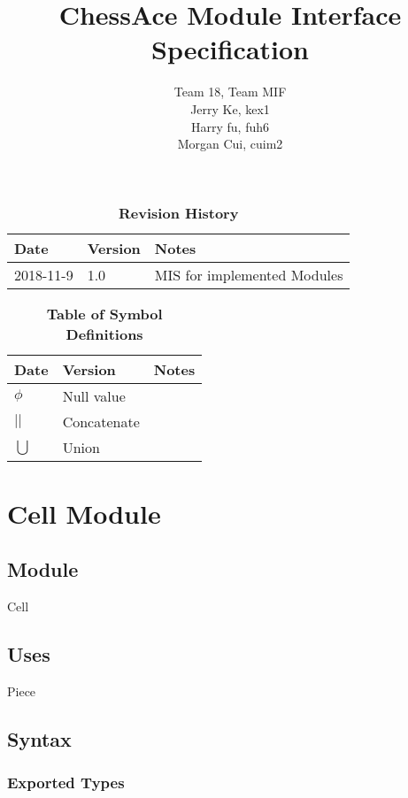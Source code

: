 \documentclass[12pt]{article}
\title{ChessAce Module Interface Specification}
\author{Team 18, Team MIF
		\\ Jerry Ke, kex1
		\\ Harry fu, fuh6
		\\ Morgan Cui, cuim2
}
\begin{document}
\maketitle

\newpage

\begin{table}[H]
\begin{tabularx}{\textwidth}{p{3cm}p{2cm}X}
\toprule {\bf Date} & {\bf Version} & {\bf Notes}\\
\midrule
2018-11-9 & 1.0 & MIS for implemented Modules\\
\bottomrule
\end{tabularx}
\caption{\bf Revision History}
\end{table}

\begin{table}[H]

	\begin{tabularx}{\textwidth}{p{3cm}p{2cm}X}
\toprule {\bf Date} & {\bf Version} & {\bf Notes}\\
\midrule
$\phi$ &Null value\\
\hline
$||$ &Concatenate\\
\hline
$\bigcup$ &Union\\
\bottomrule
\end{tabularx}
		\caption{\bf Table of Symbol Definitions}
		\label{table2}
\end{table}	

\newpage

\section* {Cell Module}

\subsection*{Module}

Cell

\subsection* {Uses}

Piece

\subsection* {Syntax}

\subsubsection* {Exported Types}
\end{document}
